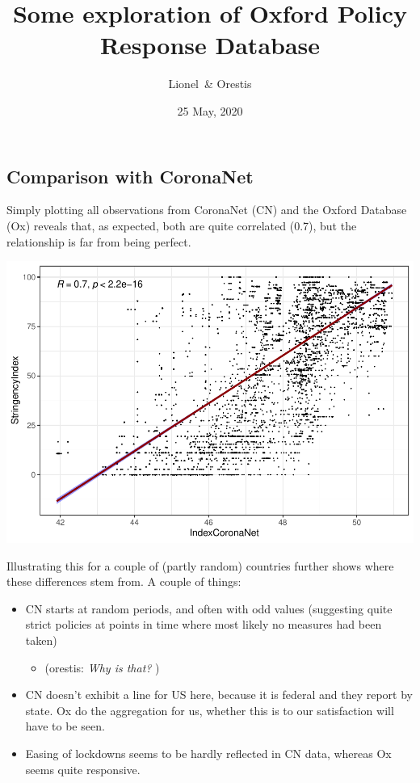 \documentclass[
  english,
  ,doc,floatsintext]{apa6}
\author{Lionel\ \& Orestis}
\affiliation{\phantom{a}}
\title{Some exploration of Oxford Policy Response Database}
\date{25 May, 2020}
\providecommand{\tightlist}{%
  \setlength{\itemsep}{0pt}\setlength{\parskip}{0pt}}
\begin{document}
\maketitle

\hypertarget{comparison-with-coronanet}{%
\subsection{Comparison with CoronaNet}\label{comparison-with-coronanet}}

Simply plotting all observations from CoronaNet (CN) and the Oxford Database (Ox) reveals that, as expected, both are quite correlated (0.7), but the relationship is far from being perfect.

\includegraphics{LR_explore_OK_comms_files/figure-latex/scatter-1.pdf}

Illustrating this for a couple of (partly random) countries further shows where these differences stem from. A couple of things:

\begin{itemize}
\tightlist
\item
  CN starts at random periods, and often with odd values (suggesting quite strict policies at points in time where most likely no measures had been taken)

  \begin{itemize}
  \item
    {\color{blue} {(\sf orestis:} {\sl{Why is that?}}     {\sf )}}
  \end{itemize}
\item
  CN doesn't exhibit a line for US here, because it is federal and they report by state. Ox do the aggregation for us, whether this is to our satisfaction will have to be seen.
\item
  Easing of lockdowns seems to be hardly reflected in CN data, whereas Ox seems quite responsive.
\end{itemize}
\end{document}
